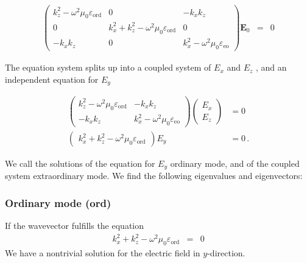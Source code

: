 \documentclass[12pt,a4paper,twoside,openright,BCOR10mm,headsepline,titlepage,abstracton,chapterprefix,final]{scrreprt}
\newcommand\Vector[1]{{\mathbf{#1}}}
\newcommand\vacuum{0}
\newcommand\wavenumber{k}
\newcommand\scalarEfield{E}
\newcommand\Efield{\Vector{\scalarEfield}}
\newcommand\vacuumpermeability{\scalarpermeability_{\vacuum}}
\newcommand\scalarpermeability{\mu}
\newcommand\scalarpermittivity{\varepsilon}
\newcommand\ordi{\text{ord}}
\newcommand\eo{\text{eo}}
\begin{document}
\begin{eqnarray}
\begin{pmatrix}
 \wavenumber_z^2 - \omega^2 \vacuumpermeability \scalarpermittivity_{\ordi} 
 &
 0
 &
 - \wavenumber_x \wavenumber_z 
 \\
 0
 &
 \wavenumber_x^2 + \wavenumber_z^2 - \omega^2 \vacuumpermeability \scalarpermittivity_{\ordi} 
 &
 0 
 \\
 - \wavenumber_x \wavenumber_z 
 &
 0 
 &
 \wavenumber_x^2 - \omega^2 \vacuumpermeability \scalarpermittivity_{\eo}  
\end{pmatrix}
\Efield_0
&=& 0
\end{eqnarray}

The equation system splits up into a coupled system of $\scalarEfield_x$ and $\scalarEfield_z$ , and an independent equation for $\scalarEfield_y$

\begin{subequations}
\begin{align}
\begin{pmatrix}
 \wavenumber_z^2 - \omega^2 \vacuumpermeability \scalarpermittivity_{\ordi} 
 &
 - \wavenumber_x \wavenumber_z 
 \\
 - \wavenumber_x \wavenumber_z 
 &
 \wavenumber_x^2 - \omega^2 \vacuumpermeability \scalarpermittivity_{\eo}  
\end{pmatrix} 
\begin{pmatrix}
 \scalarEfield_x 
 \\
 \scalarEfield_z
\end{pmatrix}
&= 0
\\
\begin{pmatrix} \wavenumber_x^2 + \wavenumber_z^2 - \omega^2 \vacuumpermeability \scalarpermittivity_{\ordi} \end{pmatrix} \scalarEfield_y &= 0\,.
\end{align}
\end{subequations}

We call the solutions of the equation for $\scalarEfield_y$ ordinary mode, and of the coupled system extraordinary mode.
We find the following eigenvalues and eigenvectors:
\subsubsection{Ordinary mode (ord)}

If the wavevector fulfills the equation
\begin{eqnarray}
  \wavenumber_x^2 + \wavenumber_z^2 - \omega^2 \vacuumpermeability \scalarpermittivity_{\ordi} &=& 0 
\end{eqnarray}
We have a nontrivial solution for the electric field in $y$-direction.
\end{document}
